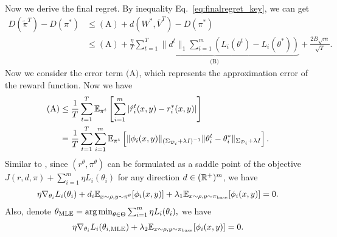 Now we derive the final regret.
By inequality Eq.~\eqref{eq:finalregret_key}, we can get
\begin{align*}D(\tilde{\pi}^T) - D(\pi^*)&\le \mathrm{(A)} + d(W^*, \overline{V}^T) - D(\pi^*)\\
&\le \mathrm{(A)} +  \underbrace{\frac{\eta}{T}\sum_{t=1}^T \|d^t\|_1\sum_{i=1}^m (L_i(\theta^t) - L_i(\theta^*))}_{\text{(B)}} + \frac{2B\sqrt{m}}{\sqrt{T}}.\end{align*}
Now we consider the error term $\text{(A)}$, which represents the approximation error of the reward function. Now we have 
\begin{align*}
    \text{(A)}&\le \frac{1}{T}\sum_{t=1}^T \mathbb{E}_{\pi^t}\left[\sum_{i=1}^m  |\hat{r}_i^t(x,y) - r_i^*(x,y)|\right]\\
    & = \frac{1}{T}\sum_{t=1}^T \sum_{i=1}^m\mathbb{E}_{\pi^t}\left[\|\phi_i(x,y)\|_{(\Sigma_{\mathcal{D}_i}+\lambda I)^{-1}} \|\theta_i^t - \theta_i^*\|_{\Sigma_{\mathcal{D}_i}+\lambda I } \right].
\end{align*}
Similar to \citep{cen2024value}, since $(r^\theta,\pi^\theta)$ can be formulated as a saddle point of the objective $J(r,d,\pi) + \sum_{i=1}^m \eta L_i(\theta_i)$ for any direction $d \in (\mathbb{R}^{+})^m$, we have 
\begin{align*}
    \eta \nabla_{\theta_i} L_i(\theta_i) + d_i \mathbb{E}_{x\sim \rho, y\sim \pi^{\theta}}[\phi_i(x,y)] + \lambda_1\mathbb{E}_{x\sim \rho, y\sim \pi_{\mathrm{base}}}[\phi_i(x,y)] = 0.
\end{align*}
Also, denote $\theta_{\mathrm{MLE}}=\operatorname*{arg\,min}_{\theta \in \Theta} \sum_{i=1}^m \eta L_i(\theta_i), $ we have 
\begin{align*}
    \eta \nabla_{\theta_i} L_i(\theta_{i,\mathrm{MLE}}) + \lambda_2 \mathbb{E}_{x\sim \rho, y\sim \pi_{\mathrm{base}}}[\phi_i(x,y)] = 0.
\end{align*}

